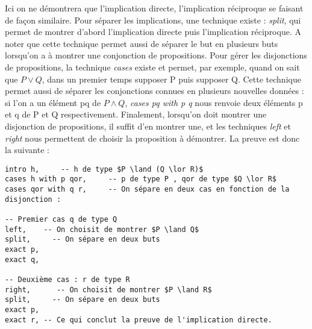 Ici on ne démontrera que l'implication directe, l'implication réciproque se faisant de façon similaire.
Pour séparer les implications, une technique existe : \textit{split}, qui permet de montrer d'abord l'implication directe puis l'implication réciproque. A noter que cette technique permet aussi de séparer le but en plusieurs buts lorsqu'on a à montrer une conjonction de propositions.
Pour gérer les disjonctions de propositions, la technique \textit{cases} existe et permet, par exemple, quand on sait que $P\lor Q$, dans un premier temps supposer P puis supposer Q. Cette technique permet aussi de séparer les conjonctions connues en plusieurs nouvelles données : si l'on a un élément pq de $P\land Q$, \textit{cases pq with p q} nous renvoie deux éléments p et q de P et Q respectivement.
Finalement, lorsqu'on doit montrer une disjonction de propositions, il suffit d'en montrer une, et les techniques \textit{left} et \textit{right} nous permettent de choisir la proposition à démontrer.
La preuve est donc la suivante : 
\begin{verbatim}
intro h,     -- h de type $P \land (Q \lor R)$
cases h with p qor,     -- p de type P , qor de type $Q \lor R$
cases qor with q r,     -- On sépare en deux cas en fonction de la disjonction :

-- Premier cas q de type Q
left,    -- On choisit de montrer $P \land Q$
split,     -- On sépare en deux buts
exact p,
exact q,

-- Deuxième cas : r de type R
right,      -- On choisit de montrer $P \land R$
split,     -- On sépare en deux buts
exact p,
exact r, -- Ce qui conclut la preuve de l'implication directe.
\end{verbatim}
